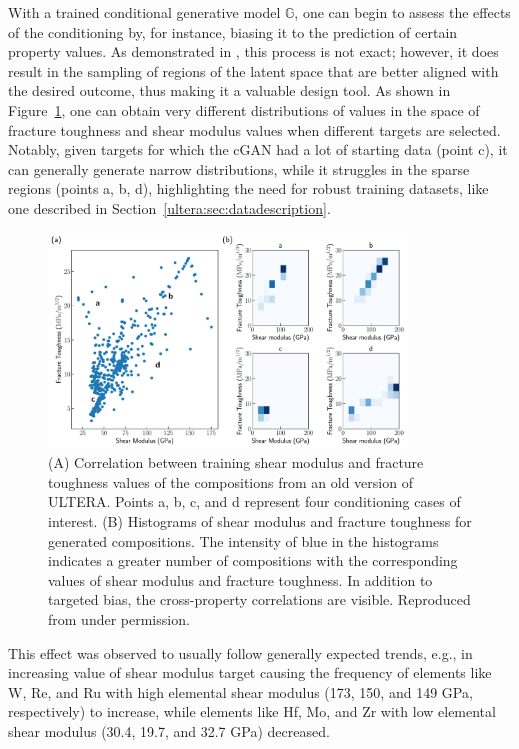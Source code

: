 With a trained conditional generative model $\mathbb{G}$, one can begin to assess the effects of the conditioning by, for instance, biasing it to the prediction of certain property values. As demonstrated in \citet{Debnath2021GenerativeAlloys}, this process is not exact; however, it does result in the sampling of regions of the latent space that are better aligned with the desired outcome, thus making it a valuable design tool. As shown in Figure~\ref{inverse:fig:propbias}, one can obtain very different distributions of values in the space of fracture toughness and shear modulus values when different targets are selected. Notably, given targets for which the cGAN had a lot of starting data (point c), it can generally generate narrow distributions, while it struggles in the sparse regions (points a, b, d), highlighting the need for robust training datasets, like one described in Section~\ref{ultera:sec:datadescription}.

\begin{figure}[H]
    \centering
    \includegraphics[width=0.85\textwidth]{inversedesign/fixed_cond_multi_points.pdf}
    \caption{(A) Correlation between training shear modulus and fracture toughness values of the compositions from an old version of ULTERA. Points a, b, c, and d represent four conditioning cases of interest. (B) Histograms of shear modulus and fracture toughness for generated compositions. The intensity of blue in the histograms indicates a greater number of compositions with the corresponding values of shear modulus and fracture toughness. In addition to targeted bias, the cross-property correlations are visible. Reproduced from \cite{Debnath2021GenerativeAlloys} under permission.}
    \label{inverse:fig:propbias}
\end{figure}

This effect was observed to usually follow generally expected trends, e.g., in increasing value of shear modulus target causing the frequency of elements like W, Re, and Ru with high elemental shear modulus (173, 150, and 149 GPa, respectively) to increase, while elements like Hf, Mo, and Zr with low elemental shear modulus (30.4, 19.7, and 32.7 GPa) decreased.



